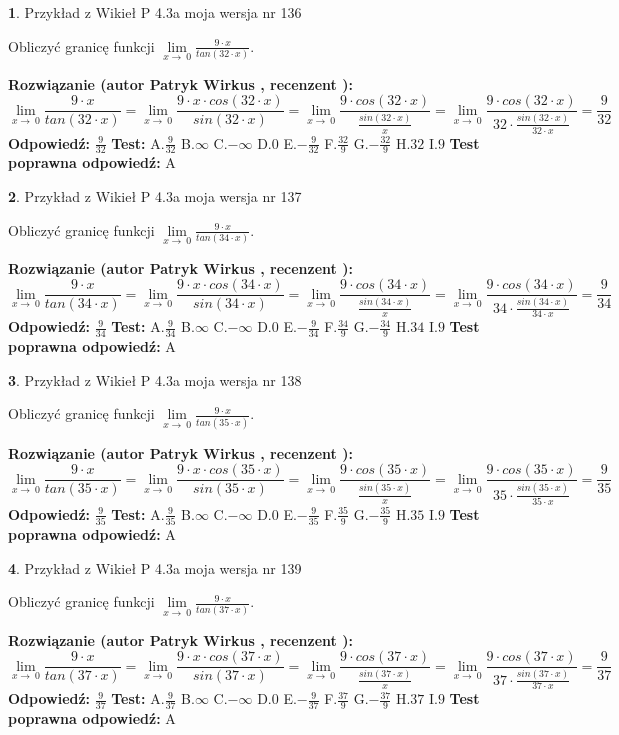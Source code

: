 \documentclass[12pt, a4paper]{article}
\theoremstyle{definition} %
\newtheorem{zad}{}
\newcommand{\zadStart}[1]{\begin{zad}#1\newline}
\newcommand{\zadStop}{\end{zad}}
\newcommand{\rozwStart}[2]{\noindent \textbf{Rozwiązanie (autor #1 , recenzent #2): }\newline}
\newcommand{\rozwStop}{\newline}
\newcommand{\odpStart}{\noindent \textbf{Odpowiedź:}\newline}
\newcommand{\odpStop}{\newline}
\newcommand{\testStart}{\noindent \textbf{Test:}\newline}
\newcommand{\testStop}{\newline}
\newcommand{\kluczStart}{\noindent \textbf{Test poprawna odpowiedź:}\newline}
\newcommand{\kluczStop}{\newline}
\begin{document}
\zadStart{Przykład z Wikieł P 4.3a moja wersja nr 136}


Obliczyć granicę funkcji $\lim\limits_{x\to\ 0}\frac{9 \cdot x}{tan(32 \cdot x)}$.
\zadStop
\rozwStart{Patryk Wirkus}{}
$$\lim\limits_{x\to\ 0}\frac{9 \cdot x}{tan(32 \cdot x)}=\lim\limits_{x\to\ 0}\frac{9 \cdot x \cdot cos(32 \cdot x)}{sin(32 \cdot x)}=\lim\limits_{x\to\ 0}\frac{9 \cdot cos(32 \cdot x)}{\frac{sin(32 \cdot x)}{x}}=\lim\limits_{x\to\ 0}\frac{9 \cdot cos(32 \cdot x)}{32 \cdot \frac{sin(32 \cdot x)}{32 \cdot x}} = \frac{9}{32}$$
\rozwStop
\odpStart
$\frac{9}{32}$
\odpStop
\testStart
A.$\frac{9}{32}$
B.$\infty$
C.$-\infty$
D.$0$
E.$-\frac{9}{32}$
F.$\frac{32}{9}$
G.$-\frac{32}{9}$
H.$32$
I.$9$
\testStop
\kluczStart
A
\kluczStop



\zadStart{Przykład z Wikieł P 4.3a moja wersja nr 137}


Obliczyć granicę funkcji $\lim\limits_{x\to\ 0}\frac{9 \cdot x}{tan(34 \cdot x)}$.
\zadStop
\rozwStart{Patryk Wirkus}{}
$$\lim\limits_{x\to\ 0}\frac{9 \cdot x}{tan(34 \cdot x)}=\lim\limits_{x\to\ 0}\frac{9 \cdot x \cdot cos(34 \cdot x)}{sin(34 \cdot x)}=\lim\limits_{x\to\ 0}\frac{9 \cdot cos(34 \cdot x)}{\frac{sin(34 \cdot x)}{x}}=\lim\limits_{x\to\ 0}\frac{9 \cdot cos(34 \cdot x)}{34 \cdot \frac{sin(34 \cdot x)}{34 \cdot x}} = \frac{9}{34}$$
\rozwStop
\odpStart
$\frac{9}{34}$
\odpStop
\testStart
A.$\frac{9}{34}$
B.$\infty$
C.$-\infty$
D.$0$
E.$-\frac{9}{34}$
F.$\frac{34}{9}$
G.$-\frac{34}{9}$
H.$34$
I.$9$
\testStop
\kluczStart
A
\kluczStop



\zadStart{Przykład z Wikieł P 4.3a moja wersja nr 138}


Obliczyć granicę funkcji $\lim\limits_{x\to\ 0}\frac{9 \cdot x}{tan(35 \cdot x)}$.
\zadStop
\rozwStart{Patryk Wirkus}{}
$$\lim\limits_{x\to\ 0}\frac{9 \cdot x}{tan(35 \cdot x)}=\lim\limits_{x\to\ 0}\frac{9 \cdot x \cdot cos(35 \cdot x)}{sin(35 \cdot x)}=\lim\limits_{x\to\ 0}\frac{9 \cdot cos(35 \cdot x)}{\frac{sin(35 \cdot x)}{x}}=\lim\limits_{x\to\ 0}\frac{9 \cdot cos(35 \cdot x)}{35 \cdot \frac{sin(35 \cdot x)}{35 \cdot x}} = \frac{9}{35}$$
\rozwStop
\odpStart
$\frac{9}{35}$
\odpStop
\testStart
A.$\frac{9}{35}$
B.$\infty$
C.$-\infty$
D.$0$
E.$-\frac{9}{35}$
F.$\frac{35}{9}$
G.$-\frac{35}{9}$
H.$35$
I.$9$
\testStop
\kluczStart
A
\kluczStop



\zadStart{Przykład z Wikieł P 4.3a moja wersja nr 139}


Obliczyć granicę funkcji $\lim\limits_{x\to\ 0}\frac{9 \cdot x}{tan(37 \cdot x)}$.
\zadStop
\rozwStart{Patryk Wirkus}{}
$$\lim\limits_{x\to\ 0}\frac{9 \cdot x}{tan(37 \cdot x)}=\lim\limits_{x\to\ 0}\frac{9 \cdot x \cdot cos(37 \cdot x)}{sin(37 \cdot x)}=\lim\limits_{x\to\ 0}\frac{9 \cdot cos(37 \cdot x)}{\frac{sin(37 \cdot x)}{x}}=\lim\limits_{x\to\ 0}\frac{9 \cdot cos(37 \cdot x)}{37 \cdot \frac{sin(37 \cdot x)}{37 \cdot x}} = \frac{9}{37}$$
\rozwStop
\odpStart
$\frac{9}{37}$
\odpStop
\testStart
A.$\frac{9}{37}$
B.$\infty$
C.$-\infty$
D.$0$
E.$-\frac{9}{37}$
F.$\frac{37}{9}$
G.$-\frac{37}{9}$
H.$37$
I.$9$
\testStop
\kluczStart
A
\kluczStop
\end{document}

